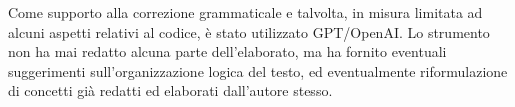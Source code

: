 Come supporto alla correzione grammaticale e talvolta, in misura limitata ad alcuni aspetti relativi al codice, è stato 
utilizzato GPT/OpenAI. Lo strumento non ha mai redatto alcuna parte dell'elaborato, ma ha fornito eventuali suggerimenti sull'organizzazione
logica del testo, ed eventualmente riformulazione di concetti già redatti ed elaborati dall'autore stesso.